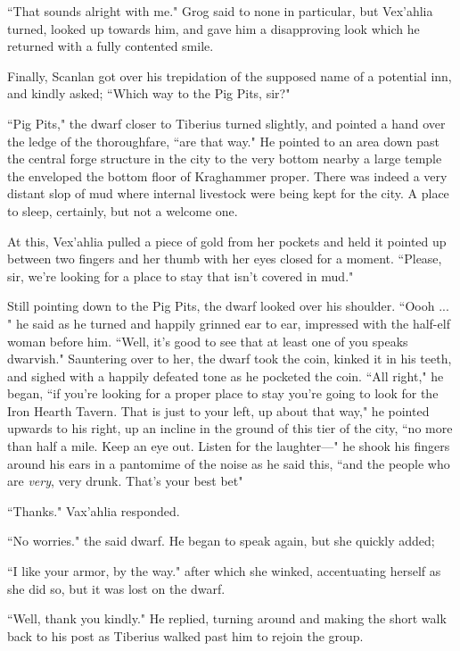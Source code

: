 ``That sounds alright with me." Grog said to none in particular, but Vex'ahlia turned, looked up towards him, and gave him a disapproving look which he returned with a fully contented smile.

Finally, Scanlan got over his trepidation of the supposed name of a potential inn, and kindly asked; ``Which way to the Pig Pits, sir?"

``Pig Pits," the dwarf closer to Tiberius turned slightly, and pointed a hand over the ledge of the thoroughfare, ``are that way." He pointed to an area down past the central forge structure in the city to the very bottom nearby a large temple the enveloped the bottom floor of Kraghammer proper. There was indeed a very distant slop of mud where internal livestock were being kept for the city. A place to sleep, certainly, but not a welcome one.

At this, Vex'ahlia pulled a piece of gold from her pockets and held it pointed up between two fingers and her thumb with her eyes closed for a moment. ``Please, sir, we're looking for a place to stay that isn't covered in mud."

Still pointing down to the Pig Pits, the dwarf looked over his shoulder. ``Oooh ... " he said as he turned and happily grinned ear to ear, impressed with the half-elf woman before him. ``Well, it's good to see that at least one of you speaks dwarvish." Sauntering over to her, the dwarf took the coin, kinked it in his teeth, and sighed with a happily defeated tone as he pocketed the coin. ``All right," he began, ``if you're looking for a proper place to stay you're going to look for the Iron Hearth Tavern. That is just to your left, up about that way," he pointed upwards to his right, up an incline in the ground of this tier of the city, ``no more than half a mile. Keep an eye out. Listen for the laughter---" he shook his fingers around his ears in a pantomime of the noise as he said this, ``and the people who are \textit{very}, very drunk. That's your best bet"

``Thanks." Vax'ahlia responded.

``No worries." the said dwarf. He began to speak again, but she quickly added;

``I like your armor, by the way." after which she winked, accentuating herself as she did so, but it was lost on the dwarf.

``Well, thank you kindly." He replied, turning around and making the short walk back to his post as Tiberius walked past him to rejoin the group.


